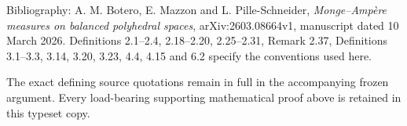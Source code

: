 \documentclass[
  11pt,
]{article}
\begin{document}
Bibliography: A. M. Botero, E. Mazzon and L. Pille-Schneider,
\emph{Monge--Ampère measures on balanced polyhedral spaces},
arXiv:2603.08664v1, manuscript dated 10 March 2026. Definitions
2.1--2.4, 2.18--2.20, 2.25--2.31, Remark 2.37, Definitions 3.1--3.3,
3.14, 3.20, 3.23, 4.4, 4.15 and 6.2 specify the conventions used here.

The exact defining source quotations remain in full in the accompanying
frozen argument. Every load-bearing supporting mathematical proof above
is retained in this typeset copy.
\end{document}
